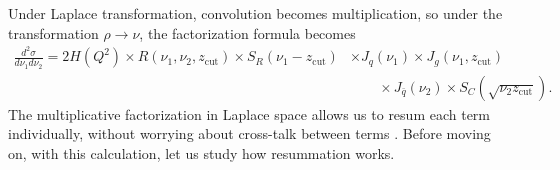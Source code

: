 \documentclass[12pt,twoside,class=../reedthesis, crop=false]{standalone}
\providecommand{\zcut}{z_\mathrm{{cut}}}
\begin{document}
	Under Laplace transformation, convolution becomes multiplication, so under the transformation $\rho \to \nu$, the factorization formula becomes
	\begin{equation}\label{eq:factorization formula laplace}
	\begin{aligned}
		\frac{d^2\sigma}{d\nu_1 d\nu_2} = 2 H(Q^2) \times R(\nu_1, \nu_2, \zcut) \times S_R(\nu_1 - \zcut) &\times J_q(\nu_1) \times J_g(\nu_1, \zcut) \\
		&\qquad\times J_{\bar q}(\nu_2) \times S_C(\sqrt{\nu_2 \zcut}).
	\end{aligned}
	\end{equation}
	The multiplicative factorization in Laplace space allows us to resum each term individually, without worrying about cross-talk between terms \cite{frye_factorization_2016}. Before moving on, with this calculation, let us study how resummation works.
\end{document}
